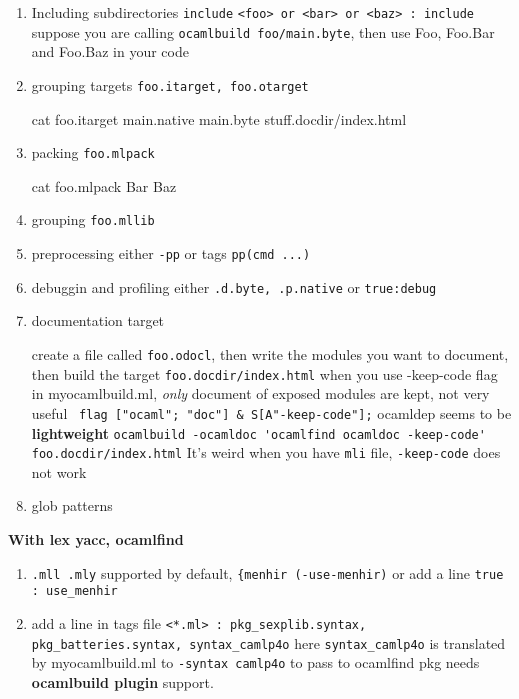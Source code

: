 \begin{enumerate}
\item Including subdirectories \verb|include|
  \verb|<foo> or <bar> or <baz> : include|
  suppose you are calling 
  \verb|ocamlbuild foo/main.byte|, then use Foo, Foo.Bar and Foo.Baz
  in your code
\item grouping targets \verb|foo.itarget, foo.otarget|
  \begin{bluetext}
cat foo.itarget
main.native
main.byte 
stuff.docdir/index.html    
  \end{bluetext}

\item  packing \verb|foo.mlpack|
  \begin{bluetext}
cat foo.mlpack    
Bar
Baz
  \end{bluetext}
\item grouping \verb|foo.mllib|
\item preprocessing either \verb|-pp| or tags \verb|pp(cmd ...)|
\item debuggin and profiling either \verb|.d.byte, .p.native| or 
  \verb|true:debug|
\item documentation target
  
  create a file called \verb|foo.odocl|, then write the modules you
  want to document, then build the target \verb|foo.docdir/index.html|
  when you use -keep-code flag in myocamlbuild.ml, \textit{only}
  document of exposed modules are kept, not very useful
  \verb| flag ["ocaml"; "doc"] & S[A"-keep-code"];|
  ocamldep seems to  be \textbf{ lightweight}
 \verb|ocamlbuild -ocamldoc 'ocamlfind ocamldoc -keep-code' foo.docdir/index.html|
 It's weird when you have \verb|mli| file, \verb|-keep-code| does not
 work
\item glob patterns
\end{enumerate}



\textbf{With lex yacc, ocamlfind }

\begin{enumerate}
\item \verb|.mll .mly| supported by default, \verb|{menhir (-use-menhir)| or add a line
  \verb|true : use_menhir|

\item add a line in tags file
  \verb|<*.ml> : pkg_sexplib.syntax, pkg_batteries.syntax, syntax_camlp4o|
  here \verb|syntax_camlp4o| is translated by myocamlbuild.ml to
 \verb|-syntax camlp4o| to pass to ocamlfind
 pkg needs \textbf{ocamlbuild plugin} support.
\end{enumerate}

